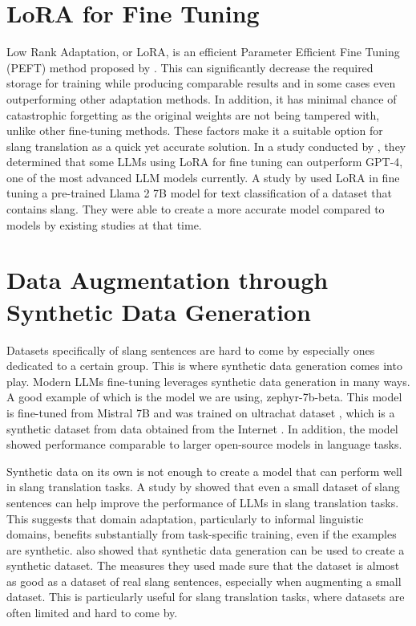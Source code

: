 \section{LoRA for Fine Tuning}
Low Rank Adaptation, or LoRA, is an efficient Parameter Efficient Fine Tuning (PEFT) method proposed by .
This can significantly decrease the required storage for training while producing comparable results and in some cases even outperforming other adaptation methods.
In addition, it has minimal chance of catastrophic forgetting as the original weights are not being tampered with, unlike other fine-tuning methods.
These factors make it a suitable option for slang translation as a quick yet accurate solution.
In a study conducted by , they determined that some LLMs using LoRA for fine tuning can outperform GPT-4, one of the most advanced LLM models currently.
A study by  used LoRA in fine tuning a pre-trained Llama 2 7B model for text classification of a dataset that contains slang.
They were able to create a more accurate model compared to models by existing studies at that time.

\section{Data Augmentation through Synthetic Data Generation}
Datasets specifically of slang sentences are hard to come by especially ones dedicated to a certain group. This is where synthetic data generation comes into play. Modern LLMs fine-tuning leverages synthetic data generation in many ways. A good example of which is the model we are using, zephyr-7b-beta. This model is fine-tuned from Mistral 7B and was trained on ultrachat dataset \cite{tunstall2023zephyr}, which is a synthetic dataset from data obtained from the Internet \cite{ding2023enhancing}. In addition, the model showed performance comparable to larger open-source models in language tasks.

Synthetic data on its own is not enough to create a model that can perform well in slang translation tasks. A study by  showed that even a small dataset of slang sentences can help improve the performance of LLMs in slang translation tasks. This suggests that domain adaptation, particularly to informal linguistic domains, benefits substantially from task-specific training, even if the examples are synthetic.  also showed that synthetic data generation can be used to create a synthetic dataset. The measures they used made sure that the dataset is almost as good as a dataset of real slang sentences, especially when augmenting a small dataset. This is particularly useful for slang translation tasks, where datasets are often limited and hard to come by.

